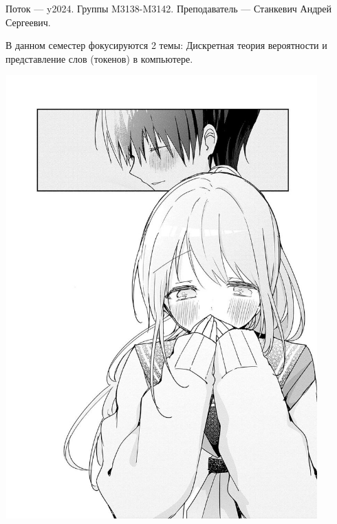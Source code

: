 Поток — y2024.\newline
Группы M3138-M3142.\newline
Преподаватель --- Станкевич Андрей Сергеевич.\par
В данном семестер фокусируются 2 темы: Дискретная теория вероятности и представление слов (токенов) в компьютере.\newline
\begin{center}
   \includegraphics[width=12cm, height=17cm]{assets/myLove.jpg}
\end{center}